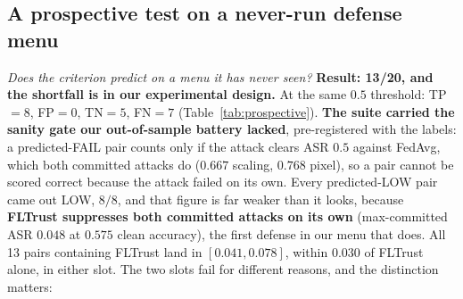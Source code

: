 \documentclass{article}
\begin{document}
\subsection{A prospective test on a never-run defense menu}
\label{sec:prospective}
\noindent \emph{Does the criterion predict on a menu it has never seen?}
\textbf{Result: 13/20, and the shortfall is in our experimental design.} At the same $0.5$ threshold: TP${}=8$, FP${}=0$, TN${}=5$, FN${}=7$ (Table~\ref{tab:prospective}). \textbf{The suite carried the sanity gate our out-of-sample battery lacked}, pre-registered with the labels: a predicted-FAIL pair counts only if the attack clears ASR $0.5$ against FedAvg, which both committed attacks do ($0.667$ scaling, $0.768$ pixel), so a pair cannot be scored correct because the attack failed on its own. Every predicted-LOW pair came out LOW, $8/8$, and that figure is far weaker than it looks, because \textbf{FLTrust suppresses both committed attacks on its own} (max-committed ASR $0.048$ at $0.575$ clean accuracy), the first defense in our menu that does. All 13 pairs containing FLTrust land in $[0.041, 0.078]$, within $0.030$ of FLTrust alone, in either slot. The two slots fail for different reasons, and the distinction matters:
\end{document}
